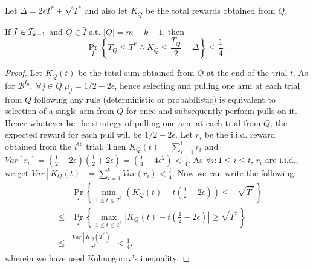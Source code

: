 Let $\Delta = 2\epsilon T^* + \sqrt{T^*}$ and also let $K_Q$ be the total rewards obtained from $Q$.
\begin{lemma}\label{lem:boundreward}
If $I \in \mathcal{I}_{k-1}$ and $Q \in \bar{I}$ s.t. $|Q| = m-k+1$, then 
 $$\Pr_{I}\left\{T_{Q} \leq T^* \wedge K_{Q} \leq \frac{T_{Q}}{2} - \Delta\right\} \leq \frac{1}{4}\;.$$
\end{lemma}
\begin{proof}
 Let $K_{Q}(t)$ be the total sum obtained from $Q$ at the end of
 the trial $t$. As for $\mathcal{B}^{I_0},\; \forall j\in Q\; \mu_j = 1/2 -2\epsilon$,
 hence selecting and pulling one arm at each trial from $Q$ following any rule (deterministic or probabilistic) is
 equivalent to selection of a single arm from $Q$ for once and subsequently perform
 pulls on it. Hence whatever be the strategy of pulling one arm at each trial from $Q$, the
 expected reward for each pull will be $1/2-2\epsilon$. Let $r_i$ be the i.i.d. reward
 obtained from the $i^\text{th}$ trial. Then $K_{Q}(t) = \sum_{i=1}^t r_i$ and
 $Var\left[r_i\right] = \left(\frac{1}{2} - 2\epsilon\right) \left(\frac{1}{2} + 2\epsilon\right) = \left(\frac{1}{4} - 4\epsilon^2\right) < \frac{1}{4}$.
 As $\forall i: 1 \leq i \leq t$, $r_i$ are i.i.d., we get $Var[K_{Q}(t)] = \sum_{i=1}^tVar(r_i) < \frac{t}{4}$.
 Now we can write the following:
 \begin{eqnarray}
  &&\Pr_{I}\left\{\min\limits_{1\leq t \leq T^*} \left(K_{Q}(t) -t\left(\frac{1}{2}-2\epsilon\right)\right) \leq -\sqrt{T^*}\right\} \nonumber\\
    & \leq & \Pr_{I}\left\{\max\limits_{1\leq t \leq T^*} \left|K_{Q}(t) -t\left(\frac{1}{2}-2\epsilon\right)\right|  \geq  \sqrt{T^*}\right\}\nonumber\\
    & \leq & \frac{Var[K_{Q}(T^*)]}{T^*} < \frac{1}{4},
\end{eqnarray}
 wherein we have used Kolmogorov's inequality.
\end{proof}

